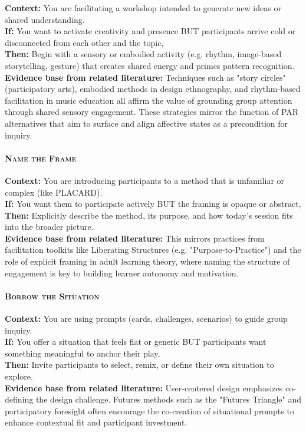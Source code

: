 \documentclass[acmlarge,timestamp]{acmart}
\begin{document}
\noindent\textbf{Context:} You are facilitating a workshop intended to generate new ideas or shared understanding.\\
\textbf{If:} You want to activate creativity and presence BUT participants arrive cold or disconnected from each other and the topic,\\
\textbf{Then:} Begin with a sensory or embodied activity (e.g. rhythm, image-based storytelling, gesture) that creates shared energy and primes pattern recognition.\\
\textbf{Evidence base from related literature:} Techniques such as "story circles" (participatory arts), embodied methods in design ethnography, and rhythm-based facilitation in music education all affirm the value of grounding group attention through shared sensory engagement. These strategies mirror the function of PAR alternatives that aim to surface and align affective states as a precondition for inquiry.

\paragraph*{{\scshape Name the Frame}}

\noindent\textbf{Context:} You are introducing participants to a method that is unfamiliar or complex (like PLACARD).\\
\textbf{If:} You want them to participate actively BUT the framing is opaque or abstract,\\
\textbf{Then:} Explicitly describe the method, its purpose, and how today’s session fits into the broader picture.\\
\textbf{Evidence base from related literature:} This mirrors practices from facilitation toolkits like Liberating Structures (e.g. "Purpose-to-Practice") and the role of explicit framing in adult learning theory, where naming the structure of engagement is key to building learner autonomy and motivation.

\paragraph*{{\scshape Borrow the Situation}}

\noindent \textbf{Context:} You are using prompts (cards, challenges, scenarios) to guide group inquiry.\\
\textbf{If:} You offer a situation that feels flat or generic BUT participants want something meaningful to anchor their play,\\
\textbf{Then:} Invite participants to select, remix, or define their own situation to explore.\\
\textbf{Evidence base from related literature:} User-centered design emphasizes co-defining the design challenge. Futures methods such as the "Futures Triangle" and participatory foresight often encourage the co-creation of situational prompts to enhance contextual fit and participant investment.
\end{document}

